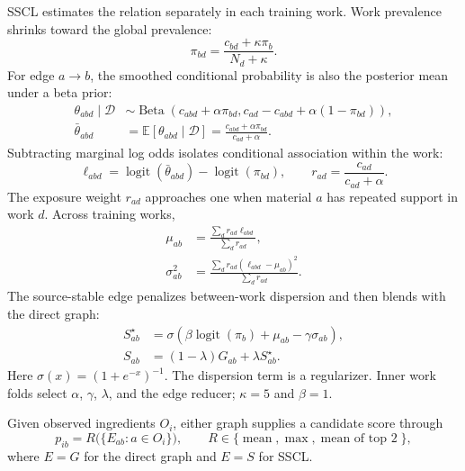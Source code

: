 \documentclass[11pt,a4paper]{article}
\newcommand{\SSCL}{\textsc{SSCL}}
\begin{document}
\SSCL{} estimates the relation separately in each training work. Work prevalence shrinks toward the global prevalence:
\begin{equation}
\pi_{bd}=\frac{c_{bd}+\kappa\pi_b}{N_d+\kappa}.
\label{eq:sourceprev}
\end{equation}
For edge $a\rightarrow b$, the smoothed conditional probability is also the posterior mean under a beta prior:
\begin{align}
\theta_{abd}\mid\mathcal{D}
&\sim \operatorname{Beta}\!\left(c_{abd}+\alpha\pi_{bd},
c_{ad}-c_{abd}+\alpha(1-\pi_{bd})\right), \\
\bar\theta_{abd}
&=\mathbb{E}[\theta_{abd}\mid\mathcal{D}]
=\frac{c_{abd}+\alpha\pi_{bd}}{c_{ad}+\alpha}.
\label{eq:betaconditional}
\end{align}
Subtracting marginal log odds isolates conditional association within the work:
\begin{equation}
\ell_{abd}=\operatorname{logit}(\bar\theta_{abd})-
\operatorname{logit}(\pi_{bd}),\qquad
r_{ad}=\frac{c_{ad}}{c_{ad}+\alpha}.
\label{eq:liftweight}
\end{equation}
The exposure weight $r_{ad}$ approaches one when material $a$ has repeated support in work $d$. Across training works,
\begin{align}
\mu_{ab}&=\frac{\sum_d r_{ad}\ell_{abd}}{\sum_d r_{ad}},\\
\sigma_{ab}^{2}&=\frac{\sum_d r_{ad}(\ell_{abd}-\mu_{ab})^2}{\sum_d r_{ad}}.
\label{eq:pool}
\end{align}
The source-stable edge penalizes between-work dispersion and then blends with the direct graph:
\begin{align}
S^{\star}_{ab}&=\sigma\!\left(\beta\operatorname{logit}(\pi_b)+\mu_{ab}-\gamma\sigma_{ab}\right),\\
S_{ab}&=(1-\lambda)G_{ab}+\lambda S^{\star}_{ab}.
\label{eq:sscl}
\end{align}
Here $\sigma(x)=(1+e^{-x})^{-1}$. The dispersion term is a regularizer. Inner work folds select $\alpha$, $\gamma$, $\lambda$, and the edge reducer; $\kappa=5$ and $\beta=1$.

Given observed ingredients $O_i$, either graph supplies a candidate score through
\begin{equation}
p_{ib}=R\bigl(\{E_{ab}:a\in O_i\}\bigr),\qquad
R\in\{\operatorname{mean},\operatorname{max},\operatorname{mean\ of\ top\ 2}\},
\label{eq:reducer}
\end{equation}
where $E=G$ for the direct graph and $E=S$ for \SSCL{}.
\end{document}
